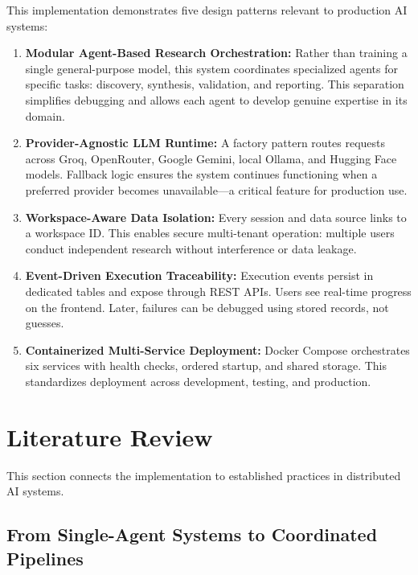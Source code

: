 \documentclass[12pt, a4paper]{article}
\begin{document}
This implementation demonstrates five design patterns relevant to production AI systems:

\begin{enumerate}[label=\textbf{\alph*}.]
  \item \textbf{Modular Agent-Based Research Orchestration:} Rather than training a single general-purpose model, this system coordinates specialized agents for specific tasks: discovery, synthesis, validation, and reporting. This separation simplifies debugging and allows each agent to develop genuine expertise in its domain.
  
  \item \textbf{Provider-Agnostic LLM Runtime:} A factory pattern routes requests across Groq, OpenRouter, Google Gemini, local Ollama, and Hugging Face models. Fallback logic ensures the system continues functioning when a preferred provider becomes unavailable—a critical feature for production use.
  
  \item \textbf{Workspace-Aware Data Isolation:} Every session and data source links to a workspace ID. This enables secure multi-tenant operation: multiple users conduct independent research without interference or data leakage.
  
  \item \textbf{Event-Driven Execution Traceability:} Execution events persist in dedicated tables and expose through REST APIs. Users see real-time progress on the frontend. Later, failures can be debugged using stored records, not guesses.
  
  \item \textbf{Containerized Multi-Service Deployment:} Docker Compose orchestrates six services with health checks, ordered startup, and shared storage. This standardizes deployment across development, testing, and production.
\end{enumerate}

\section{Literature Review}

This section connects the implementation to established practices in distributed AI systems.

\subsection{From Single-Agent Systems to Coordinated Pipelines}
\end{document}
